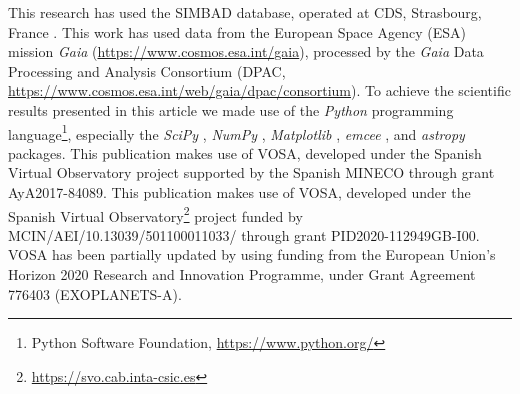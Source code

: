 \documentclass{aa}
\begin{document}
\begin{acknowledgements}

This research has used the SIMBAD database, operated at CDS, Strasbourg, France \citep{wenger2000}.
%
This work has used data from the European Space Agency (ESA) mission {\it Gaia} (\url{https://www.cosmos.esa.int/gaia}), processed by the {\it Gaia} Data Processing and Analysis Consortium (DPAC, \url{https://www.cosmos.esa.int/web/gaia/dpac/consortium}).
%
To achieve the scientific results presented in this article we made use of the \emph{Python} programming language\footnote{Python Software Foundation, \url{https://www.python.org/}}, especially the \emph{SciPy} \citep{virtanen2020}, \emph{NumPy} \citep{numpy}, \emph{Matplotlib} \citep{Matplotlib}, \emph{emcee} \citep{foreman-mackey2013}, and \emph{astropy} \citep{astropy_1,astropy_2} packages.
%
This publication makes use of VOSA, developed under the Spanish Virtual Observatory project supported by the Spanish MINECO through grant AyA2017-84089.
%
This publication makes use of VOSA, developed under the Spanish Virtual Observatory\footnote{\url{https://svo.cab.inta-csic.es}} project funded by MCIN/AEI/10.13039/501100011033/ through grant PID2020-112949GB-I00.
%
VOSA has been partially updated by using funding from the European Union's Horizon 2020 Research and Innovation Programme, under Grant Agreement 776403 (EXOPLANETS-A). 
%
\end{acknowledgements}



\end{document}

